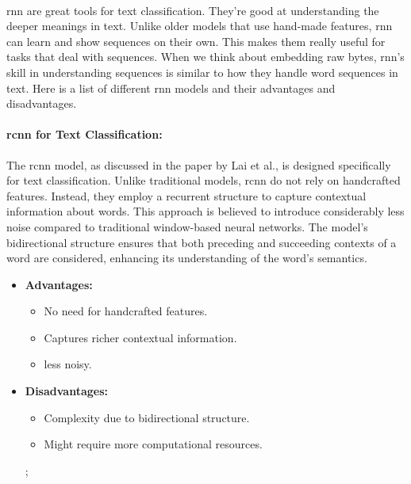         \paragraph{}\acrfull{rnn} are great tools for text classification. They're good at understanding the deeper meanings in text. Unlike older models that use hand-made features, \acrshort{rnn} can learn and show sequences on their own. This makes them really useful for tasks that deal with sequences. When we think about embedding raw bytes, \acrshort{rnn}'s skill in understanding sequences is similar to how they handle word sequences in text. Here is a list of different \acrshort{rnn} models and their advantages and disadvantages.

        \paragraph{\acrfull{rcnn} for Text Classification\cite{lai_recurrent_2015}:} The \acrshort{rcnn} model, as discussed in the paper by Lai et al., is designed specifically for text classification. Unlike traditional models, \acrshort{rcnn} do not rely on handcrafted features. Instead, they employ a recurrent structure to capture contextual information about words. This approach is believed to introduce considerably less noise compared to traditional window-based neural networks. The model's bidirectional structure ensures that both preceding and succeeding contexts of a word are considered, enhancing its understanding of the word's semantics.

        \begin{itemize}
            \item \textbf{Advantages:} 
            \begin{itemize}
                \item No need for handcrafted features.
                \item Captures richer contextual information.
                \item less noisy.
            \end{itemize}
            \item \textbf{Disadvantages:} 
            \begin{itemize}
                \item Complexity due to bidirectional structure.
                \item Might require more computational resources.
            \end{itemize}; 
        \end{itemize}

